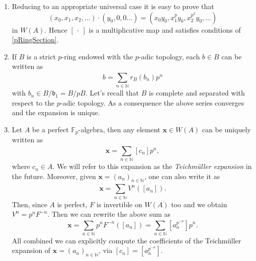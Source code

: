 \begin{rem}[]\leavevmode\vspace{-.2\baselineskip}\label{TeichmullerExpansionWitt}
\begin{enumerate}
\item Reducing to an appropriate universal case it is easy to prove that
	\begin{equation*}
		(x_0, x_1, x_2, \ldots) \cdot (y_0, 0, 0 \ldots) =
		(x_0y_0, x_1^py_0, x_2^{p^2}y_0, \ldots)
	\end{equation*}
	in $W(A)$.
	Hence $[\ \cdot\ ]$ is a multiplicative map
	and satisfies conditions of \cref{pRingSection}.

\item If $B$ is a strict $p$-ring endowed with the $p$-adic topology,
	each $b \in B$ can be written as
	\begin{equation*}
		b = \sum_{n \in \mathbb{N} }^{  } r_B(b_n) p^n
	\end{equation*}
	with $b_n \in B/\mathfrak{b}_1 = B/pB$.
	Let's recall that $B$ is complete and separated with respect to the $p$-adic
	topology.
	As a consequence the above series converges and the expansion is unique.

\item Let $A$ be a perfect $\mathbb{F}_p$-algebra, then any element $\mathbf{x} \in W(A)$
	can be uniquely written as
	\begin{equation*}
		\mathbf{x} = \sum_{n \in \mathbb{N} }^{  } [c_n] p^n
	,\end{equation*}
	where $c_n \in A$.
	We will refer to this expansion as the \emph{Teichmüller expansion} in the future.
	Moreover, given $\mathbf{x} = \left( a_n \right)_{n \in \mathbb{N}}$, one can also write it as
	\begin{equation*}
		\mathbf{x} = \sum_{n \in \mathbb{N} }^{  } V^n([a_n])
	.\end{equation*}
	Then, since $A$ is perfect, $F$ is invertible on $W(A)$ too
	and we obtain $V^n = p^n F^{-n}$. Then we can rewrite the above sum as
	\begin{equation*}
		\mathbf{x} = 
		\sum_{n \in \mathbb{N} }^{  } p^n F^{-n}([a_n]) =
		\sum_{n \in \mathbb{N} } [a_n^{p^{-n}}] p^n
	.\end{equation*}
	All combined we can explicitly compute the coefficients
	of the Teichmüller expansion of $\mathbf{x} = \left( a_n \right)_{n \in \mathbb{N}}$,
	via $[c_n] = [a_n^{p^{-n}}]$.
\end{enumerate}
\end{rem}



